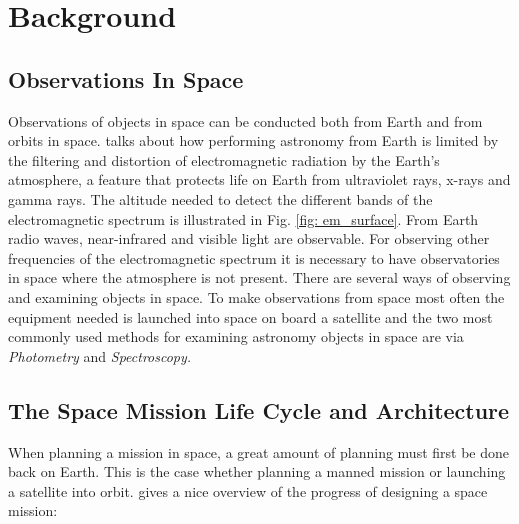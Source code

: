 \chapter{Background}
\section{Observations In Space}
Observations of objects in space can be conducted both from Earth and from orbits in space.
\citet{Mons} talks about how performing astronomy from Earth is limited by the filtering and distortion of electromagnetic radiation by the Earth's atmosphere, a feature that protects life on Earth from ultraviolet rays, x-rays and gamma rays. The altitude needed to detect the different bands of the electromagnetic spectrum is illustrated in Fig. \ref{fig: em_surface}. From Earth radio waves, near-infrared and visible light are observable. For observing other frequencies of the electromagnetic spectrum it is necessary to have observatories in space where the atmosphere is not present. There are several ways of observing and examining objects in space. To make observations from space most often the equipment needed is launched  into space on board a satellite and the two most commonly used methods for examining astronomy objects in space are via \emph{Photometry} and \emph{Spectroscopy.}


\section{The Space Mission Life Cycle and Architecture}
When planning a mission in space, a great amount of planning must first be done back on Earth. This is the case whether planning a manned mission or launching a satellite into orbit.
\citet{smad} gives a nice overview of the progress of designing a space mission:

